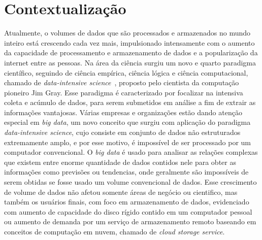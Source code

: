 
	\section{Contextualização}
	Atualmente, o volumes de dados que são processados e armazenados no mundo inteiro está crescendo cada vez mais, impulsionado intensamente com o aumento da capacidade de processamento e armazenamento de dados e a popularização da internet entre as pessoas. Na área da ciência surgiu um novo e quarto paradigma científico, seguindo de ciência empírica, ciência lógica e ciência computacional, chamado de \textit{data-intensive science}~\cite{hey2009}, proposto pelo cientista da computação pioneiro Jim Gray. Esse paradigma é caracterizado por focalizar na intensiva coleta e acúmulo de dados, para serem submetidos em análise a fim de extrair as informações vantajosas. Várias empresas e organizações estão dando atenção especial em \textit{big data}, um novo conceito que surgiu com aplicação do paradigma \textit{data-intensive science}, cujo consiste em conjunto de dados não estruturados extremamente amplo, e por esse motivo, é impossível de ser processado por um computador convencional. O \textit{big data} é usado para analisar as relações complexas que existem entre enorme quantidade de dados contidos nele para obter as informações como previsões ou tendencias, onde geralmente são impossíveis de serem obtidas se fosse usado um volume convencional de dados. Esse crescimento de volume de dados não afetou somente áreas de negócio ou cientifico, mas também os usuários finais, com foco em armazenamento de dados, evidenciado com aumento de capacidade do disco rígido contido em um computador pessoal ou aumento de demanda por um serviço de armazenamento remoto baseando em conceitos de computação em nuvem, chamado de \textit{cloud storage service}.
	\\ 

	
